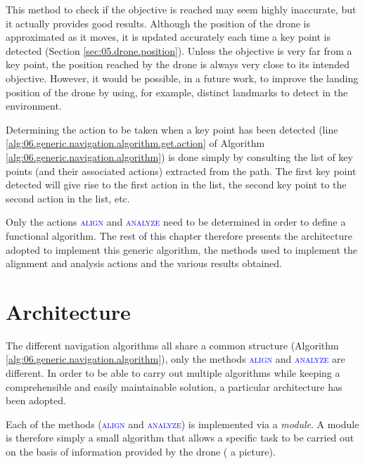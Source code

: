 \begin{note}
    This method to check if the objective is reached may seem highly inaccurate, but it actually provides good results. Although the position of the drone is approximated as it moves, it is updated accurately each time a key point is detected (Section \ref{sec:05.drone.position}). Unless the objective is very far from a key point, the position reached by the drone is always very close to its intended objective. However, it would be possible, in a future work, to improve the landing position of the drone by using, for example, distinct landmarks to detect in the environment.
\end{note}

Determining the action to be taken when a key point has been detected (line \ref{alg:06.generic.navigation.algorithm.get.action} of Algorithm \ref{alg:06.generic.navigation.algorithm}) is done simply by consulting the list of key points (and their associated actions) extracted from the path. The first key point detected will give rise to the first action in the list, the second key point to the second action in the list, etc.

Only the actions \textsc{\textcolor{blue}{align}} and \textsc{\textcolor{blue}{analyze}} need to be determined in order to define a functional algorithm. The rest of this chapter therefore presents the architecture adopted to implement this generic algorithm, the methods used to implement the alignment and analysis actions and the various results obtained.

\section{Architecture}\label{sec:06.architecture}

The different navigation algorithms all share a common structure (Algorithm \ref{alg:06.generic.navigation.algorithm}), only the methods \textsc{\textcolor{blue}{align}} and \textsc{\textcolor{blue}{analyze}} are different. In order to be able to carry out multiple algorithms while keeping a comprehensible and easily maintainable solution, a particular architecture has been adopted.

Each of the methods (\textsc{\textcolor{blue}{align}} and \textsc{\textcolor{blue}{analyze}}) is implemented via a \emph{module}. A module is therefore simply a small algorithm that allows a specific task to be carried out on the basis of information provided by the drone (\eg{} a picture).

